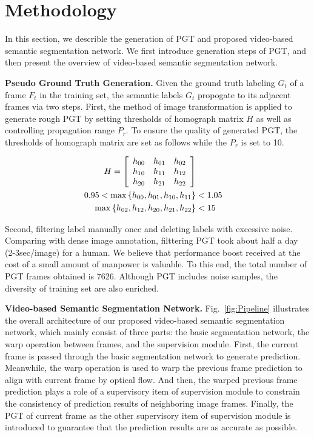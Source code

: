 \section{Methodology}
\label{sec:metho}
In this section, we describle the generation of PGT and proposed video-based semantic segmentation network.
%
We first introduce generation steps of PGT, and then present the overview of video-based semantic segmentation network.

{\bf Pseudo Ground Truth Generation.}
%
Given the ground truth labeling ${G_t}$ of a frame ${F_t}$ in the training set, the semantic labels ${G_t}$ propogate to its adjacent frames via two steps.
%
First, the method of image transformation is applied to generate rough PGT by setting thresholds of homograph matrix ${H}$ as well as controlling propagation range ${P_r}$.
%
To ensure the quality of generated PGT, the thresholds of homograph matrix are set as follows while the ${P_r}$ is set to 10.

\begin{equation}
\centering
\begin{aligned}
H
=
\left[
\begin{array}{ccc}
h_{00} & h_{01} & h_{02}\\
h_{10} & h_{11} & h_{12}\\
h_{20} & h_{21} & h_{22}\\
\end{array}
\right] \\
0.95<\max{\left\{h_{00},h_{01},h_{10},h_{11}\right\}}&<1.05\\
\max{\left\{h_{02},h_{12},h_{20},h_{21},h_{22}\right\}}&<15\\
\end{aligned}
\end{equation}

Second, filtering label manually once and deleting labels with excessive noise.
%
Comparing with dense image annotation, filttering PGT took about half a day (2-3sec/image) for a human.
%
We believe that performance boost received at the cost of a small amount of manpower is valuable.
%
To this end, the total number of PGT frames obtained is 7626.
%
Although PGT includes noise samples, the diversity of training set are also enriched. 


{\bf Video-based Semantic Segmentation Network.}
%
Fig.~\ref{fig:Pipeline} illustrates the overall architecture of our proposed video-based semantic segmentation network, which mainly consist of three parts: the basic segmentation network, the warp operation between frames, and the supervision module.
%
First, the current frame is passed through the basic segmentation network to generate prediction.
%
Meanwhile, the warp operation is used to warp the previous frame prediction to align with current frame by optical flow.
%
And then, the warped previous frame prediction plays a role of a supervisory item of supervision module to constrain the consistency of prediction results of neighboring image frames.
%
Finally, the PGT of current frame as the other supervisory item of supervision module is introduced to guarantee that the prediction results are as accurate as possible.



